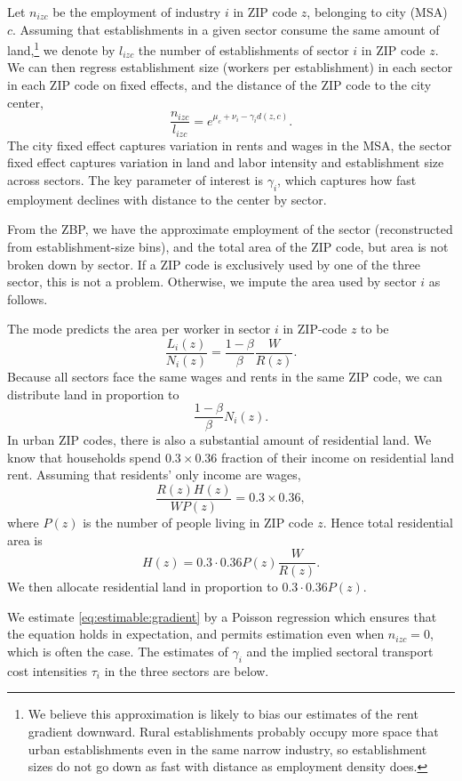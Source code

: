 \documentclass[12pt]{article}
\begin{document}
Let $n_{izc}$ be the employment of industry $i$ in ZIP code $z$, belonging to city (MSA) $c$.  Assuming that establishments in a given sector consume the same amount of land,\footnote{We believe this approximation is likely to bias our estimates of the rent gradient downward. Rural establishments probably occupy more space that urban establishments even in the same narrow industry, so establishment sizes do not go down as fast with distance as employment density does. } we denote by $l_{izc}$ the number of establishments of sector $i$ in ZIP code $z$. We can then regress establishment size (workers per establishment) in each sector in each ZIP code on fixed effects, and the distance of the ZIP code to the city center,
\begin{equation}\label{eq:estimable:gradient}
\frac{n_{izc}}{l_{izc}} = e^{\mu_c+\nu_i-\gamma_i d(z,c)}.
\end{equation}
The city fixed effect captures variation in rents and wages in the MSA, the sector fixed effect captures variation in land and labor intensity and establishment size across sectors. %
The key parameter of interest is $\gamma_i$, which captures how fast employment declines with distance to the center by sector.

From the ZBP, we have the approximate employment of the sector (reconstructed from establishment-size bins), and the total area of the ZIP code, but area is not broken down by sector. If a ZIP code is exclusively used by one of the three sector, this is not a problem. Otherwise, we impute the area used by sector $i$ as follows.

The mode predicts the area per worker in sector $i$ in ZIP-code $z$ to be
\[
\frac{L_i(z)}{N_i(z)} = \frac{1-\beta}{\beta}\frac{W}{R(z)}.
\]
Because all sectors face the same wages and rents in the same ZIP code, we can distribute land in proportion to
\[
\frac{1-\beta}{\beta}N_i(z).
\]
In urban ZIP codes, there is also a substantial amount of residential land. We know that households spend $0.3\times 0.36$ fraction of their income on residential land rent. Assuming that residents' only income are wages,
\[
\frac{R(z)H(z)}{WP(z)} = 0.3\times 0.36,
\]
where $P(z)$ is the number of people living in ZIP code $z$. Hence total residential area is
\[
H(z) = 0.3\cdot0.36 P(z) \frac{W}{R(z)}.
\]
We then allocate residential land in proportion to $0.3\cdot0.36 P(z)$.

We estimate \eqref{eq:estimable:gradient} by a Poisson regression which ensures that the equation holds in expectation, and permits estimation even when $n_{izc}=0$, which is often the case. The estimates of $\gamma_i$ and the implied sectoral transport cost intensities $\tau_i$ in the three sectors are below.
\end{document}
